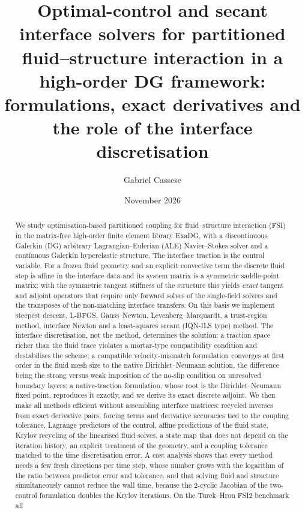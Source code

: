 \documentclass[11pt,a4paper]{article}
\title{Optimal-control and secant interface solvers for partitioned\\
fluid--structure interaction in a high-order DG framework:\\
formulations, exact derivatives and the role of the interface discretisation}
\author{Gabriel Cassese}
\date{November 2026}
\theoremstyle{definition}
\theoremstyle{remark}
\begin{document}
\maketitle

\begin{abstract}
We study optimisation-based partitioned coupling for fluid--structure interaction (FSI) in the
matrix-free high-order finite element library ExaDG, with a discontinuous Galerkin (DG)
arbitrary Lagrangian--Eulerian (ALE) Navier--Stokes solver and a continuous Galerkin hyperelastic
structure. The interface traction is the control variable. For a frozen fluid geometry and an
explicit convective term the discrete fluid step is affine in the interface data and its system
matrix is a symmetric saddle-point matrix; with the symmetric tangent stiffness of the structure
this yields \emph{exact} tangent and adjoint operators that require only forward solves of the
single-field solvers and the transposes of the non-matching interface transfers. On this basis we
implement steepest descent, L-BFGS, Gauss--Newton, Levenberg--Marquardt, a trust-region method,
interface Newton and a least-squares secant (IQN-ILS type) method.
The interface discretisation, not the method, determines the solution: a traction space richer
than the fluid trace violates a mortar-type compatibility condition and destabilises the scheme; a
compatible velocity-mismatch formulation converges at first order in the fluid mesh size to the
native Dirichlet--Neumann solution, the difference being the strong versus weak imposition of the
no-slip condition on unresolved boundary layers; a native-traction formulation, whose root is the
Dirichlet--Neumann fixed point, reproduces it exactly, and we derive its exact discrete adjoint.
We then make all methods efficient without assembling interface matrices: recycled inverses from
exact derivative pairs, forcing terms and derivative accuracies tied to the coupling tolerance,
Lagrange predictors of the control, affine predictions of the fluid state, Krylov recycling of the
linearised fluid solves, a state map that does not depend on the iteration history, an explicit
treatment of the geometry, and a coupling tolerance matched to the time discretisation error. A
cost analysis shows that every method needs a few fresh directions per time step, whose number
grows with the logarithm of the ratio between predictor error and tolerance, and that solving
fluid and structure simultaneously cannot reduce the wall time, because the 2-cyclic Jacobian of
the two-control formulation doubles the Krylov iterations. On the Turek--Hron FSI2 benchmark all

\end{abstract}
\end{document}
